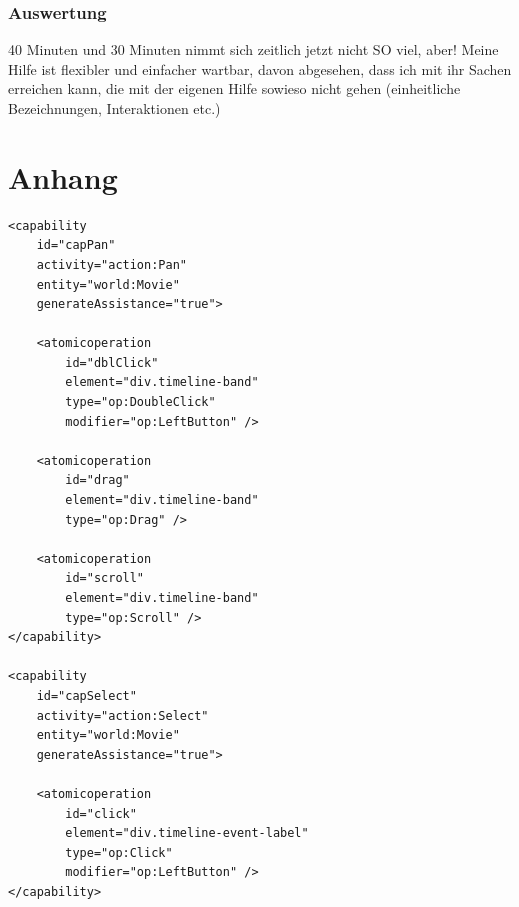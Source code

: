 \documentclass[
	headsepline,
	footsepline,
	fontsize=12pt,
	bibliography=totoc
]{scrbook}
\begin{document}
\subsection{Auswertung}
\label{section:evaluation:entwicklungsaufwand:auswertung}

40 Minuten und 30 Minuten nimmt sich zeitlich jetzt nicht SO viel, aber! Meine Hilfe ist flexibler und einfacher wartbar, davon abgesehen, dass ich mit ihr Sachen erreichen kann, die mit der eigenen Hilfe sowieso nicht gehen (einheitliche Bezeichnungen, Interaktionen etc.)



\newpage %

\appendix
\chapter{Anhang}

\lstset{language=XML}
\begin{lstlisting}[caption={Beschreibung der Capabilities}, label=code:integration-capability]
<capability
	id="capPan"
	activity="action:Pan"
	entity="world:Movie"
	generateAssistance="true">
	
	<atomicoperation
		id="dblClick"
		element="div.timeline-band"
		type="op:DoubleClick"
		modifier="op:LeftButton" />
	
	<atomicoperation
		id="drag"
		element="div.timeline-band"
		type="op:Drag" />
	
	<atomicoperation
		id="scroll"
		element="div.timeline-band"
		type="op:Scroll" />
</capability>

<capability
	id="capSelect"
	activity="action:Select"
	entity="world:Movie"
	generateAssistance="true">
	
	<atomicoperation
		id="click"
		element="div.timeline-event-label"
		type="op:Click"
		modifier="op:LeftButton" />
</capability>
\end{lstlisting}

\printbibliography[title=Literaturverzeichnis]

\end{document}
